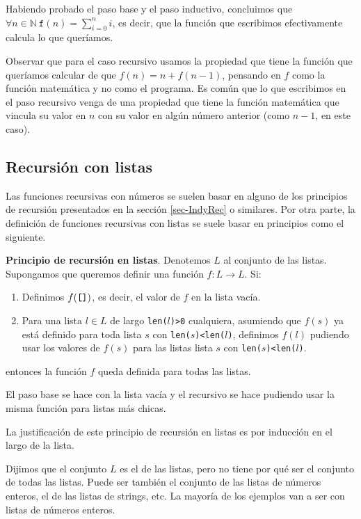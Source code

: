\documentclass[a4paper, 12pt]{report}
\newcommand{\N}{\mathbb{N}}
\newcommand{\te}{\text}
\theoremstyle{definition}
\begin{document}
Habiendo probado el paso base y el paso inductivo, concluimos que $\forall n\in\N ~\mathtt{f}(n)=\sum_{i=0}^ni$, es decir, que la función que escribimos efectivamente calcula lo que queríamos.

Observar que para el caso recursivo usamos la propiedad que tiene la función que queríamos calcular de que $f(n)=n+f(n-1)$, pensando en $f$ como la función matemática y no como el programa. Es común que lo que escribimos en el paso recursivo venga de una propiedad que tiene la función matemática que vincula su valor en $n$ con su valor en algún número anterior (como $n-1$, en este caso).

\subsection{Recursión con listas}

Las funciones recursivas con números se suelen basar en alguno de los principios de recursión presentados en la sección \ref{sec-IndyRec} o similares. Por otra parte, la definición de funciones recursivas con listas se suele basar en principios como el siguiente.

{\bf Principio de recursión en listas}. Denotemos $L$ al conjunto de las listas. Supongamos que queremos definir una función $f:L\to L$. Si:
\begin{enumerate}
	\item Definimos $f(\te{\tt []})$, es decir, el valor de $f$ en la lista vacía.
	\item Para una lista $l\in L$ de largo {\tt len($l$)>0} cualquiera, asumiendo que $f(s)$ ya está definido para toda lista $s$ con {\tt len($s$)<len($l$)}, definimos $f(l)$ pudiendo usar los valores de $f(s)$ para las listas lista $s$ con {\tt len($s$)<len($l$)}.
\end{enumerate}
entonces la función $f$ queda definida para todas las listas.

El paso base se hace con la lista vacía y el recursivo se hace pudiendo usar la misma función para listas más chicas.

La justificación de este principio de recursión en listas es por inducción en el largo de la lista.

Dijimos que el conjunto $L$ es el de las listas, pero no tiene por qué ser el conjunto de todas las listas. Puede ser también el conjunto de las listas de números enteros, el de las listas de strings, etc. La mayoría de los ejemplos van a ser con listas de números enteros.
\end{document}
